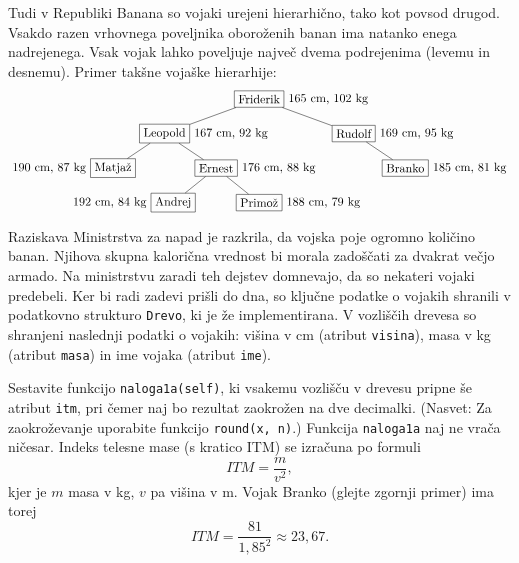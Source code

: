 \documentclass[arhiv]{../izpit}
\begin{document}

Tudi v Republiki Banana so vojaki urejeni hierarhično, tako kot povsod drugod. Vsakdo razen vrhovnega poveljnika oboroženih banan ima natanko enega nadrejenega. Vsak vojak lahko po\-vel\-ju\-je največ dvema podrejenima (levemu in desnemu). Primer takšne vojaške hierarhije:
$$
\begin{tikzpicture}[level distance=1cm,
    level 1/.style={sibling distance=5.5cm},
    level 2/.style={sibling distance=3cm},
    level 3/.style={sibling distance=2.5cm}
    ]
    \node[rectangle, draw, label=0:{165 cm, 102 kg}] (d) {Friderik}
      child {node[rectangle, draw, label=0:{167 cm, 92 kg}] {Leopold}
        child {node[rectangle, draw, label=180:{190 cm, 87 kg}] {Matjaž}}
        child {node[rectangle, draw, label=0:{176 cm, 88 kg}] {Ernest}
          child {node[rectangle, draw, label=180:{192 cm, 84 kg}] {Andrej}}
          child {node[rectangle, draw, label=0:{188 cm, 79 kg}] {Primož}}
        }
      }
      child {node[rectangle, draw, label=0:{169 cm, 95 kg}] {Rudolf}
        child[missing] {}
        child {node[rectangle, draw, label=0:{185 cm, 81 kg}] {Branko}}
      };
  \end{tikzpicture}
$$
Raziskava Ministrstva za napad je razkrila, da vojska poje ogromno količino banan. Njihova skupna kalorična vrednost bi morala zadoščati za dvakrat večjo armado. Na ministrstvu zaradi teh dejstev domnevajo, da so nekateri vojaki predebeli. Ker bi radi zadevi prišli do dna, so ključne podatke o vojakih shranili v podatkovno strukturo \texttt{Drevo}, ki je že implementirana. V vozliščih drevesa so shranjeni naslednji podatki o vojakih: višina v cm (atribut \texttt{visina}), masa v kg (atribut \texttt{masa}) in ime vojaka (atribut \texttt{ime}).

\podnaloga[10 točk]
Sestavite funkcijo \texttt{naloga1a(self)}, ki vsakemu vozlišču v drevesu pripne še atribut \texttt{itm}, pri čemer naj bo rezultat zaokrožen na dve decimalki. (Nasvet: Za zaokroževanje uporabite funkcijo \texttt{round(x, n)}.) Funkcija \texttt{naloga1a} naj ne vrača ničesar. Indeks telesne mase (s kratico ITM) se izračuna po formuli
$$\mathit{ITM} = \frac{m}{v^2},$$
kjer je $m$ masa v kg, $v$ pa višina v m. Vojak Branko (glejte zgornji primer) ima torej
$$\mathit{ITM} = \frac{81}{1,85^2} \approx 23,\!67.$$
\end{document}
